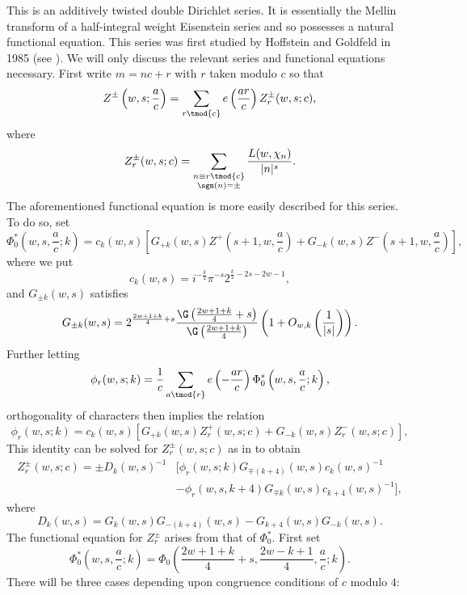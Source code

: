 \documentclass[12pt]{article}
\begin{document}
    This is an additively twisted double Dirichlet series. It is essentially the Mellin transform of a half-integral weight Eisenstein series and so possesses a natural functional equation. This series was first studied by Hoffstein and Goldfeld in 1985 (see ). We will only discuss the relevant series and functional equations necessary. First write \(m = nc+r\) with \(r\) taken modulo \(c\) so that
    \[
      Z^{\pm}\left(w,s;\frac{a}{c}\right) = \sum_{r \tmod{c}}e\left(\frac{ar}{c}\right)Z_{r}^{\pm}(w,s;c),
    \]
    where
    \[
      Z_{r}^{\pm}(w,s;c) = \sum_{\substack{n \equiv r \tmod{c} \\ \sgn(n) = \pm}}\frac{L(w,\chi_{n})}{|n|^{s}}.
    \]
    The aforementioned functional equation is more easily described for this series. To do so, set
    \[
      \Phi_{0}^{\ast}\left(w,s,\frac{a}{c};k\right) = c_{k}(w,s)\left[G_{+k}(w,s)Z^{+}\left(s+1,w,\frac{a}{c}\right)+G_{-k}(w,s)Z^{-}\left(s+1,w,\frac{a}{c}\right)\right],
    \]
    where we put
    \[
      c_{k}(w,s) = i^{-\frac{k}{2}}\pi^{-s}2^{\frac{k}{2}-2s-2w-1},
    \]
    and \(G_{\pm k}(w,s)\) satisfies
    \[
      G_{\pm k}(w,s) = 2^{\frac{2w+1+k}{4}+s}\frac{\G\left(\frac{2w+1+k}{4}+s\right)}{\G\left(\frac{2w+1+k}{4}\right)}\left(1+O_{w,k}\left(\frac{1}{|s|}\right)\right).
    \]
    Further letting
    \[
      \phi_{r}(w,s;k) = \frac{1}{c}\sum_{a \tmod{r}}e\left(-\frac{ar}{c}\right)\Phi_{0}^{\ast}\left(w,s,\frac{a}{c};k\right),
    \]
    orthogonality of characters then implies the relation
    \[
      \phi_{r}(w,s;k) = c_{k}(w,s)\left[G_{+k}(w,s)Z_{r}^{+}(w,s;c)+G_{-k}(w,s)Z_{r}^{-}(w,s;c)\right],
    \]
    This identity can be solved for \(Z_{r}^{\pm}(w,s;c)\) as in  to obtain
    \begin{align*}
        Z_{r}^{\pm}(w,s;c) = \pm D_{k}(w,s)^{-1}&\big[\phi_{r}(w,s;k)G_{\mp(k+4)}(w,s)c_{k}(w,s)^{-1} \\
        &-\phi_{r}(w,s,k+4)G_{\mp k}(w,s)c_{k+4}(w,s)^{-1}\big],
    \end{align*}
    where
    \[D_{k}(w,s) = G_{k}(w,s)G_{-(k+4)}(w,s)-G_{k+4}(w,s)G_{-k}(w,s).\]
    The functional equation for \(Z_{r}^{\pm}\) arises from that of \(\Phi_{0}^{\ast}\). First set
    \[
      \Phi_{0}^{\ast}\left(w,s,\frac{a}{c};k\right) = \Phi_{0}\left(\frac{2w+1+k}{4}+s,\frac{2w-k+1}{4},\frac{a}{c};k\right).
    \]
    There will be three cases depending upon congruence conditions of \(c\) modulo \(4\):
\end{document}
